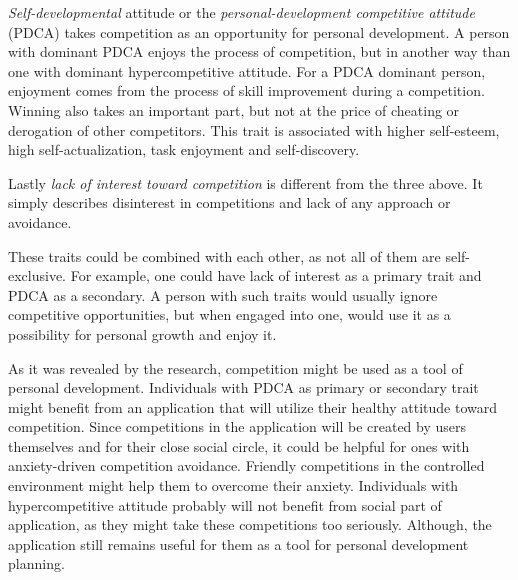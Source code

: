 \textit{Self-developmental} attitude or the \textit{personal-development competitive attitude} (PDCA)
takes competition as an opportunity for personal development.
A person with dominant PDCA enjoys the process of competition, but in another way than one with dominant hypercompetitive
attitude.
For a PDCA dominant person, enjoyment comes from the process of skill improvement during a competition.
Winning also takes an important part, but not at the price of cheating or derogation of other competitors.
This trait is associated with higher self-esteem, high self-actualization, task enjoyment and self-discovery.\cite{cit-ryckman-pdca}

Lastly \textit{lack of interest toward competition} is different from the three above.
It simply describes disinterest in competitions and lack of any approach or avoidance.

These traits could be combined with each other, as not all of them are self-exclusive.
For example, one could have lack of interest as a primary trait and PDCA as a secondary.
A person with such traits would usually ignore competitive opportunities, but when engaged into one,
would use it as a possibility for personal growth and enjoy it.\cite{the-four-faces-of-competetition}

As it was revealed by the research, competition might be used as a tool of personal development.
Individuals with PDCA as primary or secondary trait might benefit from an application that will utilize their healthy
attitude toward competition.
Since competitions in the application will be created by users themselves and for their close social circle,
it could be helpful for ones with anxiety-driven competition avoidance.
Friendly competitions in the controlled environment might help them to overcome their anxiety.
Individuals with hypercompetitive attitude probably will not benefit from social part of application,
as they might take these competitions too seriously.
Although, the application still remains useful for them as a tool for personal development planning.
